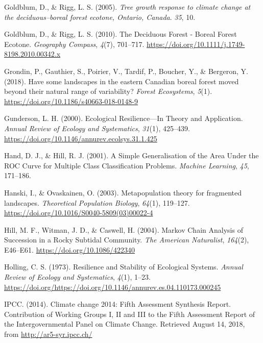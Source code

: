 \documentclass[a4paperpaper,]{article}
\begin{document}
\leavevmode\hypertarget{ref-goldblum_tree_2005}{}%
Goldblum, D., \& Rigg, L. S. (2005). \emph{Tree growth response to
climate change at the deciduous--boreal forest ecotone, Ontario,
Canada}. \emph{35}, 10.

\leavevmode\hypertarget{ref-goldblum_deciduous_2010}{}%
Goldblum, D., \& Rigg, L. S. (2010). The Deciduous Forest - Boreal
Forest Ecotone. \emph{Geography Compass}, \emph{4}(7), 701--717.
\url{https://doi.org/10.1111/j.1749-8198.2010.00342.x}

\leavevmode\hypertarget{ref-grondin_have_2018}{}%
Grondin, P., Gauthier, S., Poirier, V., Tardif, P., Boucher, Y., \&
Bergeron, Y. (2018). Have some landscapes in the eastern Canadian boreal
forest moved beyond their natural range of variability? \emph{Forest
Ecosystems}, \emph{5}(1).
\url{https://doi.org/10.1186/s40663-018-0148-9}

\leavevmode\hypertarget{ref-gunderson_ecological_2000}{}%
Gunderson, L. H. (2000). Ecological Resilience---In Theory and
Application. \emph{Annual Review of Ecology and Systematics},
\emph{31}(1), 425--439.
\url{https://doi.org/10.1146/annurev.ecolsys.31.1.425}

\leavevmode\hypertarget{ref-hand_simple_2001}{}%
Hand, D. J., \& Hill, R. J. (2001). A Simple Generalisation of the Area
Under the ROC Curve for Multiple Class Classification Problems.
\emph{Machine Learning}, \emph{45}, 171--186.

\leavevmode\hypertarget{ref-hanski_metapopulation_2003}{}%
Hanski, I., \& Ovaskainen, O. (2003). Metapopulation theory for
fragmented landscapes. \emph{Theoretical Population Biology},
\emph{64}(1), 119--127.
\url{https://doi.org/10.1016/S0040-5809(03)00022-4}

\leavevmode\hypertarget{ref-hill_markov_2004}{}%
Hill, M. F., Witman, J. D., \& Caswell, H. (2004). Markov Chain Analysis
of Succession in a Rocky Subtidal Community. \emph{The American
Naturalist}, \emph{164}(2), E46--E61.
\url{https://doi.org/10.1086/422340}

\leavevmode\hypertarget{ref-holling_resilience_1973}{}%
Holling, C. S. (1973). Resilience and Stability of Ecological Systems.
\emph{Annual Review of Ecology and Systematics}, \emph{4}(1), 1--23.
\url{https://doi.org/https://doi.org/10.1146/annurev.es.04.110173.000245}

\leavevmode\hypertarget{ref-ipcc_climate_2014}{}%
IPCC. (2014). Climate change 2014: Fifth Assessment Synthesis Report.
Contribution of Working Groups I, II and III to the Fifth Assessment
Report of the Intergovernmental Panel on Climate Change. Retrieved
August 14, 2018, from \url{http://ar5-syr.ipcc.ch/}
\end{document}
